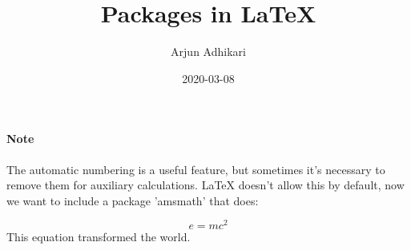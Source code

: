 \documentclass{article}
\title{Packages in  LaTeX}
\author{Arjun Adhikari}
\date{2020-03-08}
\begin{document}
	\maketitle
	\newpage
	
	\paragraph{Note}
	The automatic numbering is a useful feature, but sometimes it's necessary to remove them for auxiliary calculations. LaTeX doesn't allow this by default, now we want to include a package 'amsmath' that does:
	
	\begin{equation}
		e = mc ^ 2
	\end{equation}
	This equation transformed the world.
	
	
\end{document}
